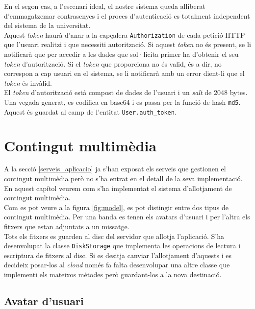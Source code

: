 En el segon cas, a l'escenari ideal, el nostre sistema queda alliberat d'emmagatzemar contrasenyes i el proces d'autenticació es totalment independent del sistema de la universitat.\\

Aquest \emph{token} haurà d'anar a la capçalera \texttt{Authorization} de cada petició \ac{HTTP} que l'usuari realitzi i que necessiti autorització. Si aquest \emph{token} no és present, se li notificarà que per accedir a les dades que sol·licita primer ha d'obtenir el seu \emph{token} d'autorització. Si el \emph{token} que proporciona no és valid, és a dir, no correspon a cap usuari en el sistema, se li notificarà amb un error dient-li que el \emph{token} és invàlid.\\

El \emph{token} d'autorització està compost de dades de l'usuari i un \emph{salt} de 2048 bytes. Una vegada generat, es codifica en base64 i es passa per la funció de hash \texttt{md5}. Aquest és guardat al camp de l'entitat \texttt{User.auth\_token}.\\

\section{Contingut multimèdia} \label{contingut_multimedia}

A la secció \ref{serveis_aplicacio} ja s'han exposat els serveis que gestionen el contingut multimèdia però no s'ha entrat en el detall de la seva implementació. En aquest capítol veurem com s'ha implementat el sistema d'allotjament de contingut multimèdia.\\

Com es pot veure a la figura \ref{fig:model}, es pot distingir entre dos tipus de contingut multimèdia. Per una banda es tenen els avatars d'usuari i per l'altra els fitxers que estan adjuntats a un missatge.\\

Tots els fitxers es guarden al disc del servidor que allotja l'aplicació. S'ha desenvolupat la classe \texttt{DiskStorage} que implementa les operacions de lectura i escriptura de fitxers al disc. Si es desitja canviar l'allotjament d'aquests i es decideix posar-los al \emph{cloud} només fa falta desenvolupar una altre classe que implementi els mateixos mètodes però guardant-los a la nova destinació.\\

\subsection{Avatar d'usuari}

